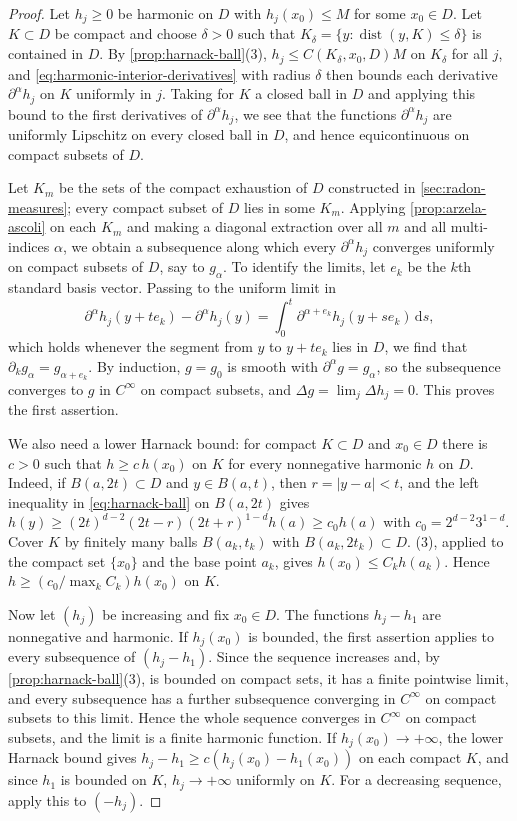\begin{proof}
Let $h_j\geq0$ be harmonic on $D$ with $h_j(x_0)\leq M$ for some $x_0\in D$. Let $K\subset D$ be compact and choose $\delta>0$ such that $K_\delta=\{y:\operatorname{dist}(y,K)\leq\delta\}$ is contained in $D$. By \cref{prop:harnack-ball}(3), $h_j\leq C(K_\delta,x_0,D)M$ on $K_\delta$ for all $j$, and \eqref{eq:harmonic-interior-derivatives} with radius $\delta$ then bounds each derivative $\partial^\alpha h_j$ on $K$ uniformly in $j$. Taking for $K$ a closed ball in $D$ and applying this bound to the first derivatives of $\partial^\alpha h_j$, we see that the functions $\partial^\alpha h_j$ are uniformly Lipschitz on every closed ball in $D$, and hence equicontinuous on compact subsets of $D$.

Let $K_m$ be the sets of the compact exhaustion of $D$ constructed in \cref{sec:radon-measures}; every compact subset of $D$ lies in some $K_m$. Applying \cref{prop:arzela-ascoli} on each $K_m$ and making a diagonal extraction over all $m$ and all multi-indices $\alpha$, we obtain a subsequence along which every $\partial^\alpha h_j$ converges uniformly on compact subsets of $D$, say to $g_\alpha$. To identify the limits, let $e_k$ be the $k$th standard basis vector. Passing to the uniform limit in
\[
 \partial^\alpha h_j(y+te_k)-\partial^\alpha h_j(y)=\int_0^t\partial^{\alpha+e_k}h_j(y+se_k)\,\mathrm ds,
\]
which holds whenever the segment from $y$ to $y+te_k$ lies in $D$, we find that $\partial_kg_\alpha=g_{\alpha+e_k}$. By induction, $g=g_0$ is smooth with $\partial^\alpha g=g_\alpha$, so the subsequence converges to $g$ in $C^\infty$ on compact subsets, and $\Delta g=\lim_j\Delta h_j=0$. This proves the first assertion.

We also need a lower Harnack bound: for compact $K\subset D$ and $x_0\in D$ there is $c>0$ such that $h\geq c\,h(x_0)$ on $K$ for every nonnegative harmonic $h$ on $D$. Indeed, if $B(a,2t)\subset D$ and $y\in B(a,t)$, then $r=|y-a|<t$, and the left inequality in \eqref{eq:harnack-ball} on $B(a,2t)$ gives $h(y)\geq(2t)^{d-2}(2t-r)(2t+r)^{1-d}h(a)\geq c_0h(a)$ with $c_0=2^{d-2}3^{1-d}$. Cover $K$ by finitely many balls $B(a_k,t_k)$ with $B(a_k,2t_k)\subset D$. (3), applied to the compact set $\{x_0\}$ and the base point $a_k$, gives $h(x_0)\leq C_kh(a_k)$. Hence $h\geq(c_0/\max_kC_k)h(x_0)$ on $K$.

Now let $(h_j)$ be increasing and fix $x_0\in D$. The functions $h_j-h_1$ are nonnegative and harmonic. If $h_j(x_0)$ is bounded, the first assertion applies to every subsequence of $(h_j-h_1)$. Since the sequence increases and, by \cref{prop:harnack-ball}(3), is bounded on compact sets, it has a finite pointwise limit, and every subsequence has a further subsequence converging in $C^\infty$ on compact subsets to this limit. Hence the whole sequence converges in $C^\infty$ on compact subsets, and the limit is a finite harmonic function. If $h_j(x_0)\to+\infty$, the lower Harnack bound gives $h_j-h_1\geq c(h_j(x_0)-h_1(x_0))$ on each compact $K$, and since $h_1$ is bounded on $K$, $h_j\to+\infty$ uniformly on $K$. For a decreasing sequence, apply this to $(-h_j)$.
\end{proof}

